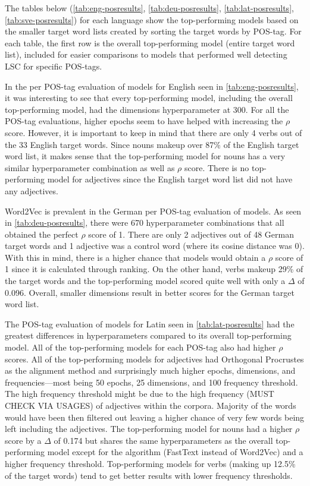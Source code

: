 The tables below (\autoref{tab:eng-posresults}, \autoref{tab:deu-posresults}, \autoref{tab:lat-posresults}, \autoref{tab:sve-posresults}) for each language show the top-performing models based on the smaller target word lists created by sorting the target words by POS-tag. For each table, the first row is the overall top-performing model (entire target word list), included for easier comparisons to models that performed well detecting LSC for specific POS-tags. 

In the per POS-tag evaluation of models for English seen in \autoref{tab:eng-posresults}, it was interesting to see that every top-performing model, including the overall top-performing model, had the dimensions hyperparameter at 300. For all the POS-tag evaluations, higher epochs seem to have helped with increasing the $\rho$ score. However, it is important to keep in mind that there are only 4 verbs out of the 33 English target words. Since nouns makeup over 87\% of the English target word list, it makes sense that the top-performing model for nouns has a very similar hyperparameter combination as well as $\rho$ score. There is no top-performing model for adjectives since the English target word list did not have any adjectives. 


Word2Vec is prevalent in the German per POS-tag evaluation of models. As seen in \autoref{tab:deu-posresults}, there were 670 hyperparameter combinations that all obtained the perfect $\rho$ score of 1. There are only 2 adjectives out of 48 German target words and 1 adjective was a control word (where its cosine distance was 0). With this in mind, there is a higher chance that models would obtain a $\rho$ score of 1 since it is calculated through ranking. On the other hand, verbs makeup 29\% of the target words and the top-performing model scored quite well with only a $\Delta$ of 0.096. Overall, smaller dimensions result in better scores for the German target word list. 


The POS-tag evaluation of models for Latin seen in \autoref{tab:lat-posresults} had the greatest differences in hyperparameters compared to its overall top-performing model. All of the top-performing models for each POS-tag also had higher $\rho$ scores. All of the top-performing models for adjectives had Orthogonal Procrustes as the alignment method and surprisingly much higher epochs, dimensions, and frequencies—most being 50 epochs, 25 dimensions, and 100 frequency threshold. The high frequency threshold might be due to the high frequency (MUST CHECK VIA USAGES) of adjectives within the corpora. Majority of the words would have been then filtered out leaving a higher chance of very few words being left including the adjectives. The top-performing model for nouns had a higher $\rho$ score by a $\Delta$ of 0.174 but shares the same hyperparameters as the overall top-performing model except for the algorithm (FastText instead of Word2Vec) and a higher frequency threshold. Top-performing models for verbs (making up 12.5\% of the target words) tend to get better results with lower frequency thresholds.


